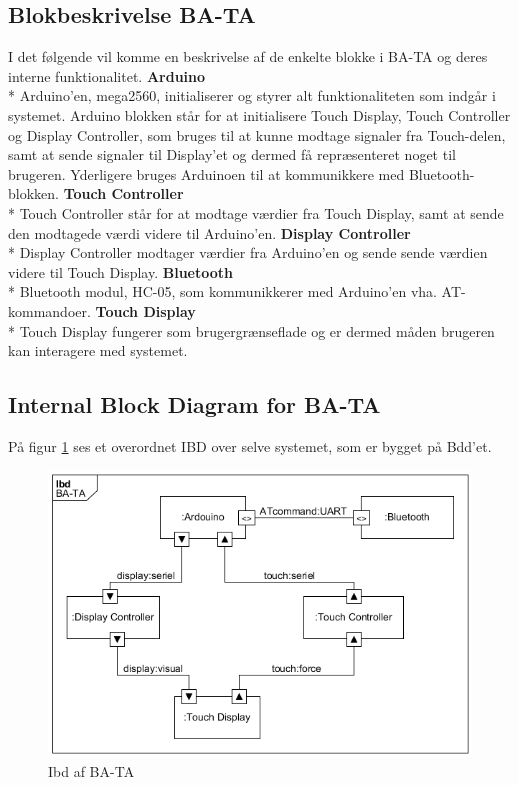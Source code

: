 \subsection{Blokbeskrivelse BA-TA}
I det følgende vil komme en beskrivelse af de enkelte blokke i BA-TA og deres interne funktionalitet.
\newline
\newline
\textbf{Arduino} \\*
Arduino'en, mega2560, initialiserer og styrer alt funktionaliteten som indgår i systemet. Arduino blokken står for at initialisere  Touch Display, Touch Controller og Display Controller, som bruges til at kunne modtage signaler fra Touch-delen, samt at sende signaler til Display'et og dermed få repræsenteret noget til brugeren. Yderligere bruges Arduinoen til at kommunikkere med Bluetooth-blokken.
\newline
\newline
\textbf{Touch Controller} \\*
Touch Controller står for at modtage værdier fra Touch Display, samt at sende den modtagede værdi videre til Arduino'en. 
\newline
\newline
\textbf{Display Controller} \\*
Display Controller modtager værdier fra Arduino'en og sende sende værdien videre til Touch Display. \newline
\newline
\textbf{Bluetooth} \\*
Bluetooth modul, HC-05, som kommunikkerer med Arduino'en vha. AT-kommandoer.
\newline
\newline
\textbf{Touch Display} \\*
Touch Display fungerer som brugergrænseflade og er dermed måden brugeren kan interagere med systemet. 
\subsection{Internal Block Diagram for BA-TA}
På figur \ref{fig:Ibd} ses et overordnet IBD over selve systemet, som er bygget på Bdd'et. 
\begin{figure}[H]
	\centering
	\includegraphics[width = 300 pt]{Img/Ibd.png}
	\caption{Ibd af BA-TA}
	\label{fig:Ibd}
\end{figure}

